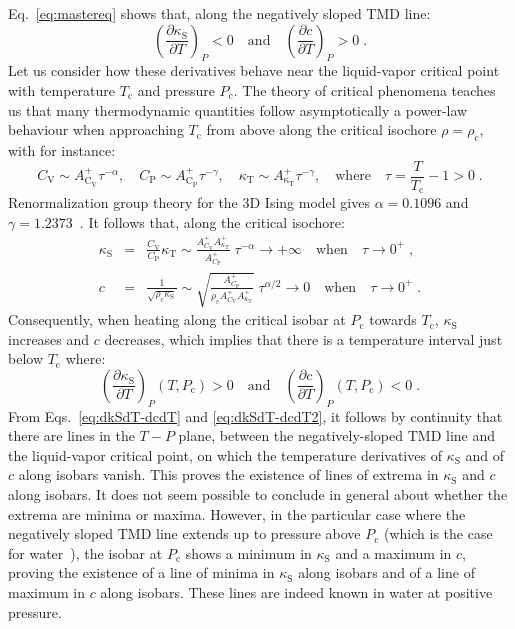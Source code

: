 \documentclass[12pt]{article}
\newcommand{\mrm}{\mathrm}
\newcommand{\kT}{\kappa_\mrm{T}}
\newcommand{\kS}{\kappa_\mrm{S}}
\newcommand{\CP}{C_\mrm{P}}
\newcommand{\CV}{C_\mrm{V}}
\begin{document}
Eq.~\ref{eq:mastereq} shows that, along the negatively sloped TMD line:
\begin{equation}
\left( \frac{\partial \kS}{\partial T} \right)_P < 0 \quad\mrm{and}\quad \left( \frac{\partial c}{\partial T} \right)_P >0 \; .
\label{eq:dkSdT-dcdT}
\end{equation}
Let us consider how these derivatives behave near the liquid-vapor critical point with temperature $T_\mrm{c}$ and pressure $P_\mrm{c}$. The theory of critical phenomena teaches us that many thermodynamic quantities follow asymptotically a power-law behaviour when approaching $T_\mrm{c}$ from above along the critical isochore $\rho=\rho_\mrm{c}$, with for instance:
\begin{equation}
\CV \sim A^+_\mrm{\CV} \tau^{-\alpha} , \quad \CP \sim A^+_\mrm{\CP} \tau^{-\gamma} , \quad \kT \sim A^+_\mrm{\kT} \tau^{-\gamma} , \quad \textrm{where} \quad \tau = \frac{T}{T_\mrm{c}} - 1 >0\; .
\label{eq:critexp}
\end{equation}
Renormalization group theory for the 3D Ising model gives $\alpha=0.1096$ and $\gamma=1.2373$~\cite{Campostrini_25thorder_2002}. It follows that, along the critical isochore:
\begin{eqnarray}
\kS & = & \frac{\CV}{\CP} \kT \sim \frac{A^+_{\CV} A^+_{\kT}}{A^+_{\CP}} \; \tau^{-\alpha} \rightarrow +\infty \quad\textrm{when}\quad \tau \rightarrow 0^+ \; ,\\
c & = & \frac{1}{\sqrt{\rho_\mrm{c} \kS}} \sim \sqrt{\frac{A^+_{\CP}}{\rho_\mrm{c} A^+_{\CV} A^+_{\kT}}} \; \tau^{\alpha/2} \rightarrow 0 \quad\textrm{when}\quad \tau \rightarrow 0^+ \; .
\end{eqnarray}
Consequently, when heating along the critical isobar at $P_\mrm{c}$ towards $T_\mrm{c}$, $\kS$ increases and $c$ decreases, which implies that there is a temperature interval just below $T_\mrm{c}$ where:
\begin{equation}
\left( \frac{\partial \kS}{\partial T} \right)_P (T,P_\mrm{c}) > 0 \quad\mrm{and}\quad \left( \frac{\partial c}{\partial T} \right)_P (T,P_\mrm{c}) < 0 \; .
\label{eq:dkSdT-dcdT2}
\end{equation}
From Eqs.~\ref{eq:dkSdT-dcdT} and \ref{eq:dkSdT-dcdT2}, it follows by continuity that there are lines in the $T-P$ plane, between the negatively-sloped TMD line and the liquid-vapor critical point, on which the temperature derivatives of $\kS$ and of $c$ along isobars vanish. This proves the existence of lines of extrema in $\kS$ and $c$ along isobars. It does not seem possible to conclude in general about whether the extrema are minima or maxima. However, in the particular case where the negatively sloped TMD line extends up to pressure above $P_\mrm{c}$ (which is the case for water~\cite{Holten_thermodynamics_2012}), the isobar at $P_\mrm{c}$ shows a minimum in $\kS$ and a maximum in $c$, proving the existence of a line of minima in $\kS$ along isobars and of a line of maximum in $c$ along isobars. These lines are indeed known in water at positive pressure.\\
\end{document}

